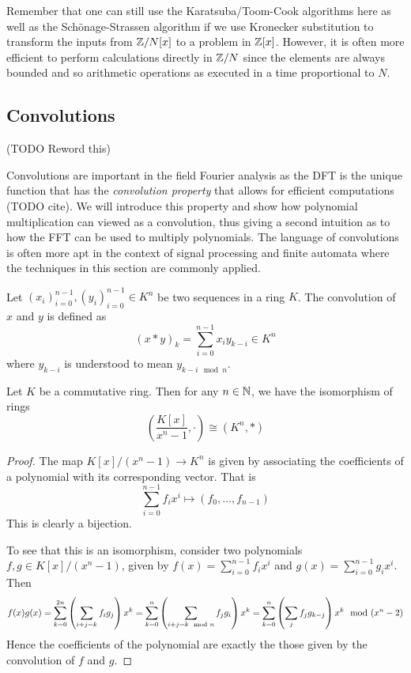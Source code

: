 Remember that one can still use the Karatsuba/Toom-Cook algorithms here as well as the Sch\"{o}nage-Strassen algorithm if we use Kronecker substitution to transform the inputs from ${\mathbb Z}/N[x]$ to a problem in ${\mathbb Z}[x]$. However, it is often more efficient to perform calculations directly in ${\mathbb Z}/N$ since the elements are always bounded and so arithmetic operations as executed in a time proportional to $N$.


\subsection{Convolutions}

(TODO Reword this)

Convolutions are important in the field Fourier analysis as the DFT is the unique function that has the \emph{convolution property} that allows for efficient computations (TODO cite). We will introduce this property and show how polynomial multiplication can viewed as a convolution, thus giving a second intuition as to how the FFT can be used to multiply polynomials. The language of convolutions is often more apt in the context of signal processing and finite automata where the techniques in this section are commonly applied.

\begin{definition}
    Let $(x_i)_{i=0}^{n-1}, (y_i)_{i=0}^{n-1} \in K^n$ be two sequences in a ring $K$. The convolution of $x$ and $y$ is defined as
    \[
        (x \ast y)_k = \sum^{n-1}_{i=0} x_i y_{k-i} \in K^n
    \]
    where $y_{k-i}$ is understood to mean $y_{k-i \mod n}$.
\end{definition}

\begin{proposition}
    Let $K$ be a commutative ring. Then for any $n \in {\mathbb N}$, we have the isomorphism of rings
    \[
        (\frac{K[x]}{x^n - 1}, \cdot) \cong (K^n, \ast)
    \]
\end{proposition}

\begin{proof}
    The map $K[x]/(x^n - 1) \to K^n$ is given by associating the coefficients of a polynomial with its corresponding vector. That is
    \[
        \sum_{i=0}^{n-1} f_i x^i \mapsto (f_0, \ldots, f_{n-1})
    \]
    This is clearly a bijection. 

    To see that this is an isomorphism, consider two polynomials $f, g \in K[x]/(x^n - 1)$, given by $f(x) = \sum_{i=0}^{n-1} f_i x^i$ and $g(x) = \sum_{i=0}^{n-1} g_i x^i$. Then 
    \[
        f(x)g(x) = \sum^{2n}_{k=0} \left(\sum_{i + j = k}f_ig_j\right) x^k = \sum^n_{k=0} \left(\sum_{i + j = k \mod n}f_jg_i\right) x^k = \sum^n_{k=0} \left(\sum_j f_jg_{k-j}\right) x^k \mod (x^n - 2)
    \]
    Hence the coefficients of the polynomial are exactly the those given by the convolution of $f$ and $g$.
\end{proof}

